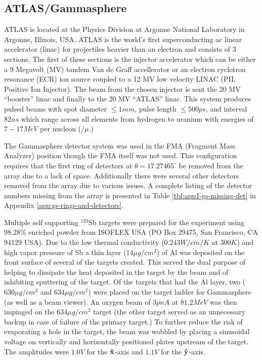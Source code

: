 \subsection{ATLAS/Gammasphere}
\label{ssec:exp-pr-details-gs}
ATLAS is located at the Physics Division at Argonne National Laboratory in Argonne, Illinois, USA. ATLAS is the world's first superconducting ac linear accelerator (linac) for projectiles heavier than an electron and consists of 3 sections. The first of these sections is the injector accelerator which can be either a 9 Megavolt (MV) tandem Van de Graff accellerator or an electron cyclotron resonance (ECR) ion source coupled to a 12 MV low velocity LINAC (PII, Positive Ion Injector). The beam from the chosen injector is sent the 20 MV ``booster'' linac and finally to the 20 MV ``ATLAS'' linac. This system produces pulsed beams with spot diameter $\leq1mm$, pulse length $\leq500ps$, and interval $82ns$ which range across all elements from hydrogen to uranium with energies of $7-17MeV$ per nucleon ($/\mu{}$.)

The Gammasphere detector system was used in the FMA (Fragment Mass Analyzer) position though the FMA itself was not used. This configuration requires that the first ring of detectors at $\theta{}=17.27465^{\circ}$ be removed from the array due to a lack of space. Additionally there were several other detectors removed from the array due to various issues. A complete listing of the detector numbers missing from the array is presented in Table \ref{tbl:app1-gs-missing-det} in Appendix \ref{app:gs-rings-and-detectors}.

Multiple self supporting $^{123}$Sb targets were prepared for the experiment using 98.28\% enriched powder from ISOFLEX USA (PO Box 29475, San Francisco, CA 94129 USA)\cite{sbTargets}. Due to the low thermal conductivity ($0.243W/cm/K$ at $300K$\cite{thermalCond}) and high vapor pressure\cite{sbPartialP,sbTargets} of Sb a thin layer ($14\mu{}g/cm^2$) of Al was deposited on the front surface of several of the targets created. This served the dual purpose of helping to dissipate the heat deposited in the target by the beam and of inhibiting sputtering of the target. Of the targets that had the Al layer, two ($630\mu{}g/cm^2$ and $634\mu{}g/cm^2$) were placed on the target ladder for Gammasphere (as well as a beam viewer). An oxygen beam of $3pnA$ at $81.2MeV$ was then impinged on the $634\mu{}g/cm^2$ target (the other target served as an unnecessary backup in case of failure of the primary target.) To further reduce the risk of evaporating a hole in the target, the beam was wobbled by placing a sinusoidal voltage on vertically and horizontally positioned plates upstream of the target. The amplitudes were $1.0V$ for the $\boldsymbol{\hat{\textbf{x}}}$-axis and $1.1V$ for the $\boldsymbol{\hat{\textbf{y}}}$-axis.

